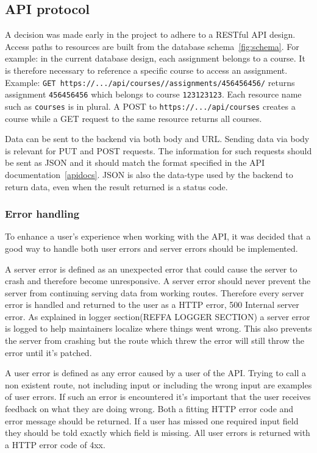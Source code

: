 \subsection{API protocol}
A decision was made early in the project to adhere to a RESTful API design. Access paths to resources are built from the database schema~\ref{fig:schema}. For example: in the current database design, each assignment belongs to a course. It is therefore necessary to reference a specific course to access an assignment. Example: \texttt{GET https://.../api/courses//assignments/456456456/} returns assignment \texttt{456456456} which belongs to course \texttt{123123123}. Each resource name such as \texttt{courses} is in plural. A POST to \texttt{https://.../api/courses} creates a course while a GET request to the same resource returns all courses.

Data can be sent to the backend via both body and URL. Sending data via body is relevant for PUT and POST requests. The information for such requests should be sent as JSON and it should match the format specified in the API documentation~\ref{apidocs}. JSON is also the data-type used by the backend to return data, even when the result returned is a status code.

\subsubsection{Error handling}
To enhance a user's experience when working with the API, it was decided that a good way to handle both user errors and server errors should be implemented.

A server error is defined as an unexpected error that could cause the server to crash and therefore become unresponsive. A server error should never prevent the server from continuing serving data from working routes. Therefore every server error is handled and returned to the user as a HTTP error, 500 Internal server error. As explained in logger section(REFFA LOGGER SECTION) a server error is logged to help maintainers localize where things went wrong. This also prevents the server from crashing but the route which threw the error will still throw the error until it's patched.

A user error is defined as any error caused by a user of the API. Trying to call a non existent route, not including input or including the wrong input are examples of user errors. If such an error is encountered it's important that the user receives feedback on what they are doing wrong. Both a fitting HTTP error code and error message should be returned. If a user has missed one required input field they should be told exactly which field is missing. All user errors is returned with a HTTP error code of 4xx.

